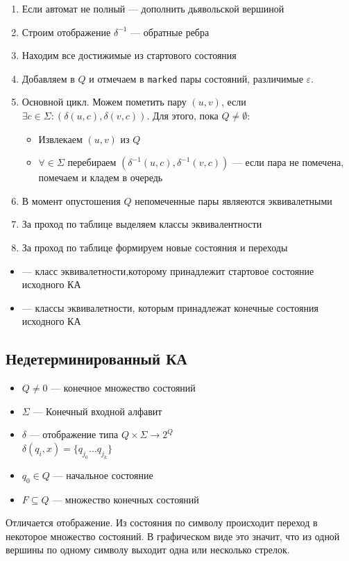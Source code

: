 \documentclass[a4paper, 14pt]{extarticle}
\begin{document}
\begin{enumerate}
    \item Если автомат не полный --- дополнить дьявольской вершиной
    \item Строим отображение $ \delta^{-1} $ --- обратные ребра
    \item Находим все достижимые из стартового состояния
    \item Добавляем в $Q$ и отмечаем в \texttt{marked} пары состояний, различимые $ \varepsilon $.
    \item Основной цикл. Можем пометить пару $(u,v)$, если $\exists c \in \Sigma: ( \delta(u,c), \delta(v, c) )$. Для этого, пока $Q \ne \emptyset$:
    \begin{itemize}
        \item Извлекаем $(u,v)$ из $Q$
        \item $\forall \in \Sigma$ перебираем $( \delta^{-1}(u,c), \delta^{-1}(v, c) )$ --- если пара не помечена, помечаем и кладем в очередь
    \end{itemize}
    \item В момент опустошения $Q$ непомеченные пары являеются эквивалетными
    \item За проход по таблице выделяем классы эквивалентности
    \item За проход по таблице формируем новые состояния и переходы
\end{enumerate}

\begin{itemize}
    \item {} --- класс эквивалетности,которому принадлежит стартовое состояние исходного КА
    \item {} --- классы эквивалетности, которым принадлежат конечные состояния исходного КА 
\end{itemize} 

\subsection{Недетерминированный КА}
\begin{itemize}
    \item $Q \ne 0$ --- конечное множество состояний 
    \item $\Sigma$ --- Конечный входной алфавит
    \item $\delta$ --- отображение типа $Q \times \Sigma \rightarrow 2^Q$\\
        $\delta (q_i, x) = \{ q_{j_0} \ldots q_{j_k} \}$
    \item $q_0 \in Q$ --- начальное состояние
    \item $F \subseteq Q$ --- множество конечных состояний
\end{itemize}
Отличается отображение. Из состояния по символу происходит переход в некоторое множество состояний. В графическом виде это значит, что из одной вершины по одному символу выходит одна или несколько стрелок.
\end{document}
